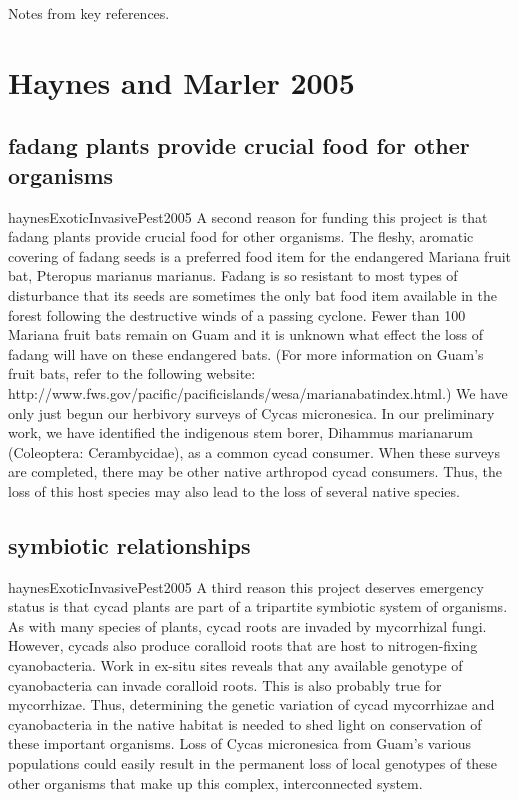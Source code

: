 \documentclass[12pt,letterpaper,english,bibliography=totocnumbered, abstract=on]{scrartcl}
\begin{document}
\newpage
\printbibliography[heading=bibintoc]

\begin{appendices}
	
	Notes from key references.

\section{Haynes and Marler 2005}

\subsection{fadang plants provide crucial food for other organisms}
\begin{displaycquote}{haynesExoticInvasivePest2005}
A second reason for funding this project is that fadang plants provide crucial food for other organisms.
The fleshy, aromatic covering of fadang seeds is a preferred food item for the endangered Mariana
fruit bat, Pteropus marianus marianus. Fadang is so resistant to most types of disturbance that its
seeds are sometimes the only bat food item available in the forest following the destructive winds of a
passing cyclone. Fewer than 100 Mariana fruit bats remain on Guam and it is unknown what effect the
loss of fadang will have on these endangered bats. (For more information on Guam’s fruit bats, refer
to the following website: http://www.fws.gov/pacific/pacificislands/wesa/marianabatindex.html.)
We have only just begun our herbivory surveys of Cycas micronesica. In our preliminary work, we
have identified the indigenous stem borer, Dihammus marianarum (Coleoptera: Cerambycidae), as a
common cycad consumer. When these surveys are completed, there may be other native arthropod
cycad consumers. Thus, the loss of this host species may also lead to the loss of several native species.
\end{displaycquote}

\subsection{symbiotic relationships}
\begin{displaycquote}{haynesExoticInvasivePest2005}
A third reason this project deserves emergency status is that cycad plants are part of a tripartite
symbiotic system of organisms. As with many species of plants, cycad roots are invaded by
mycorrhizal fungi. However, cycads also produce coralloid roots that are host to nitrogen-fixing
cyanobacteria. Work in ex-situ sites reveals that any available genotype of cyanobacteria can invade
coralloid roots. This is also probably true for mycorrhizae. Thus, determining the genetic variation of
cycad mycorrhizae and cyanobacteria in the native habitat is needed to shed light on conservation of
these important organisms. Loss of Cycas micronesica from Guam’s various populations could easily
result in the permanent loss of local genotypes of these other organisms that make up this complex,
interconnected system.
\end{displaycquote}


\end{appendices}
\end{document}
